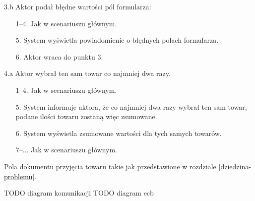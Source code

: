 \begin{usecase}
{\begin{enumerate}
      \end{enumerate}
    \item [3.b] Aktor podał błędne wartości pól formularza:
      \begin{enumerate}
        \item[1--4.] Jak w scenariuszu głównym.
        \item[5.] System wyświetla powiadomienie o błędnych polach formularza.
        \item[6.] Aktor wraca do punktu 3.
      \end{enumerate}
     \item[4.a] Aktor wybrał ten sam towar co najmniej dwa razy.
       \begin{enumerate}
       \item[1--4.] Jak w scenariuszu głównym.
       \item[5.] System informuje aktora, że co najmniej dwa razy wybrał ten sam towar, podane ilości towaru zostaną więc zsumowane.
       \item[6.] System wyświetla zsumowane wartości dla tych samych towarów.
       \item[7--...] Jak w scenariuszu głównym.
       \end{enumerate}
  }
   {
    Pola dokumentu przyjęcia towaru takie jak przedstawione w rozdziale \ref{dziedzina-problemu}.
  }
\end{usecase}
TODO diagram komunikacji TODO diagram ecb
